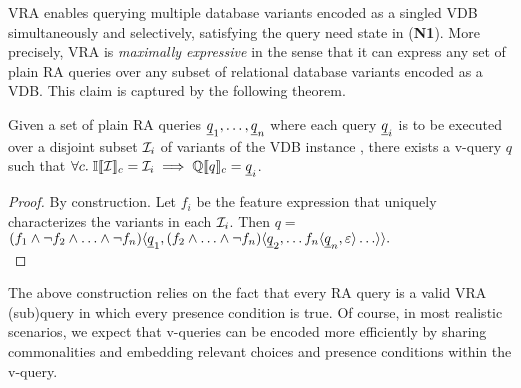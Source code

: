 
VRA enables querying multiple database variants encoded as a singled VDB
simultaneously and selectively, satisfying the query need state in 
(\textbf{N1}).
%
More precisely, VRA is \emph{maximally expressive} in the sense that it can
express any set of plain RA queries over any subset of relational database
variants encoded as a VDB. This claim is captured by the following theorem.

\begin{theorem}
\label{thm:max-expr}
Given a set of plain RA queries $\pQ_1,\ldots,\pQ_n$ where each query $\pQ_i$
is to be executed over a disjoint subset $\vdbInst_i$ of variants of the VDB
instance \vdbInst, there exists a v-query $q$ such that
$\forall c.\; \odbSem[c]{\vdbInst} = \vdbInst_i \implies \eeSem[c]{q} = \pQ_i$.
\end{theorem}

\begin{proof}
By construction. Let $f_i$ be the feature expression that uniquely
characterizes the variants in each $\vdbInst_i$.
Then $q =$ \\
\(
\chc[(f_1\wedge\neg f_2\wedge\ldots\wedge\neg f_n)]{\pQ_1,
  \chc[(f_2\wedge\ldots\wedge\neg f_n)]{\pQ_2,\ldots
    \chc[f_n]{\pQ_n,\emp}\ldots}}.
\)\\
\end{proof}

\noindent
%
The above construction relies on the fact that every RA query is a valid VRA
(sub)query in which every presence condition is true.
%
Of course, in most realistic scenarios, we expect that v-queries can be encoded
more efficiently by sharing commonalities and embedding relevant choices and
presence conditions within the v-query.


%
%
%
%


